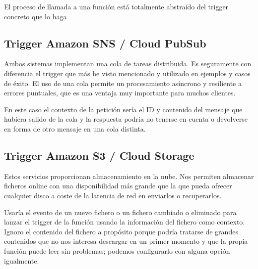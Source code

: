El proceso de llamada a una función está totalmente abstraído del trigger concreto que lo haga

\subsection{Trigger Amazon SNS / Cloud PubSub}

Ambos sistemas implementan una cola de tareas distribuida. Es seguramente con diferencia el trigger que más he visto mencionado y utilizado en ejemplos y casos de éxito. El uso de una cola permite un procesamiento asíncrono y resiliente a errores puntuales, que es una ventaja muy importante para muchos clientes.

En este caso el contexto de la petición sería el ID y contenido del mensaje que hubiera salido de la cola y la respuesta podría no tenerse en cuenta o devolverse en forma de otro mensaje en una cola distinta.

\subsection{Trigger Amazon S3 / Cloud Storage}

Estos servicios proporcionan almacenamiento en la nube. Nos permiten almacenar ficheros online con una disponibilidad más grande que la que pueda ofrecer cualquier disco a coste de la latencia de red en enviarlos o recuperarlos.

Usaría el evento de un nuevo fichero o un fichero cambiado o eliminado para lanzar el trigger de la función usando la información del fichero como contexto. Ignoro el contenido del fichero a propósito porque podría tratarse de grandes contenidos que no nos interesa descargar en un primer momento y que la propia función puede leer sin problemas; podemos configurarlo con alguna opción igualmente.
